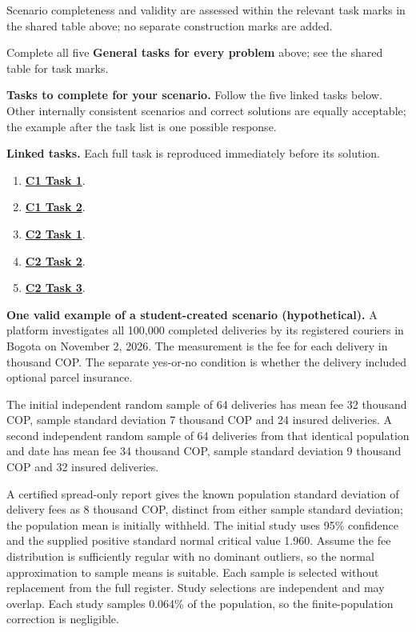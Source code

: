 Scenario completeness and validity are assessed within the relevant task marks in the shared table above; no separate construction marks are added.

Complete all five \textbf{General tasks for every problem} above; see the shared table for task marks.

\textbf{Tasks to complete for your scenario.} Follow the five linked tasks below. Other internally consistent scenarios and correct solutions are equally acceptable; the example after the task list is one possible response.

\clearpage
\textbf{Linked tasks.} Each full task is reproduced immediately before its solution.

\begin{enumerate}[label=(\alph*),itemsep=6pt]
\item \hyperref[sol:p3c1a]{\textbf{C1 Task 1}}. \cOneA\ 
\item \hyperref[sol:p3c1b]{\textbf{C1 Task 2}}. \cOneB\ 
\item \hyperref[sol:p3c2a]{\textbf{C2 Task 1}}. \cTwoA\ 
\item \hyperref[sol:p3c2b]{\textbf{C2 Task 2}}. \cTwoB\ 
\item \hyperref[sol:p3c2c]{\textbf{C2 Task 3}}. \cTwoC\ 
\end{enumerate}
\secInicio[][sec:p3]

\clearpage

\textbf{One valid example of a student-created scenario (hypothetical).}
A platform investigates all 100,000 completed deliveries by its registered couriers in Bogota on November 2, 2026. The measurement is the fee for each delivery in thousand COP. The separate yes-or-no condition is whether the delivery included optional parcel insurance.

The initial independent random sample of 64 deliveries has mean fee 32 thousand COP, sample standard deviation 7 thousand COP and 24 insured deliveries. A second independent random sample of 64 deliveries from that identical population and date has mean fee 34 thousand COP, sample standard deviation 9 thousand COP and 32 insured deliveries.

A certified spread-only report gives the known population standard deviation of delivery fees as 8 thousand COP, distinct from either sample standard deviation; the population mean is initially withheld. The initial study uses 95\% confidence and the supplied positive standard normal critical value 1.960. Assume the fee distribution is sufficiently regular with no dominant outliers, so the normal approximation to sample means is suitable. Each sample is selected without replacement from the full register. Study selections are independent and may overlap. Each study samples 0.064\% of the population, so the finite-population correction is negligible.

